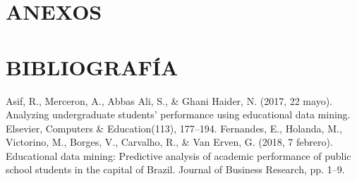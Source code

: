 \documentclass[spanish,12pt, a4paper,twoside]{paper}
\let\oldsection\section
\def\section{\cleardoublepage\oldsection}
\begin{document}
\section*{ANEXOS}


\section*{BIBLIOGRAFÍA}

\newpage

\begin{thebibliography}{00}
 Asif, R., Merceron, A., Abbas Ali, S., \& Ghani Haider, N. (2017, 22 mayo). Analyzing undergraduate students' performance using educational data mining. Elsevier, Computers \& Education(113), 177–194.
Fernandes, E., Holanda, M., Victorino, M., Borges, V., Carvalho, R., \& Van Erven, G. (2018, 7 febrero). Educational data mining: Predictive analysis of academic performance of public school students in the capital of Brazil. Journal of Business Research, pp. 1–9.

\end{thebibliography}
\end{document}
